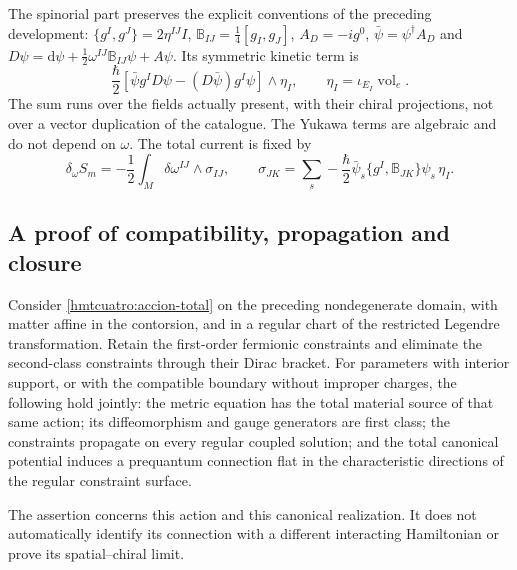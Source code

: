 The spinorial part preserves the explicit conventions of the preceding development: \(\{g^I,g^J\}=2\eta^{IJ}I\), \(\mathbb B_{IJ}=\frac14[g_I,g_J]\), \(A_D=-ig^0\), \(\bar\psi=\psi^\dagger A_D\) and \(D\psi=\mathrm d\psi+\frac12\omega^{IJ}\mathbb B_{IJ}\psi+A\psi\). Its symmetric kinetic term is
\[
 \frac{\hbar}{2}
 [\bar\psi g^I D\psi-(D\bar\psi)g^I\psi]\wedge\eta_I,
 \qquad \eta_I=\iota_{E_I}\operatorname{vol}_e .
\]
The sum runs over the fields actually present, with their chiral projections, not over a vector duplication of the catalogue. The Yukawa terms are algebraic and do not depend on \(\omega\). The total current is fixed by
\begin{equation}
 \delta_\omega S_m=-\frac12\int_M\delta\omega^{IJ}\wedge\sigma_{IJ},
 \qquad
 \sigma_{JK}=\sum_s-\frac{\hbar}{2}
   \bar\psi_s\{g^I,\mathbb B_{JK}\}\psi_s\,\eta_I.
 \label{hmtcuatro:corriente-total}
\end{equation}

\subsection{A proof of compatibility, propagation and closure}
\label{hmtcuatro:demostracion-unica}

\begin{theorem}
\label{hmtcuatro:teorema-canonico-total} Consider \eqref{hmtcuatro:accion-total} on the preceding nondegenerate domain, with matter affine in the contorsion, and in a regular chart of the restricted Legendre transformation. Retain the first-order fermionic constraints and eliminate the second-class constraints through their Dirac bracket. For parameters with interior support, or with the compatible boundary without improper charges, the following hold jointly: the metric equation has the total material source of that same action; its diffeomorphism and gauge generators are first class; the constraints propagate on every regular coupled solution; and the total canonical potential induces a prequantum connection flat in the characteristic directions of the regular constraint surface.

The assertion concerns this action and this canonical realization. It does not automatically identify its connection with a different interacting Hamiltonian or prove its spatial--chiral limit.
\end{theorem}

